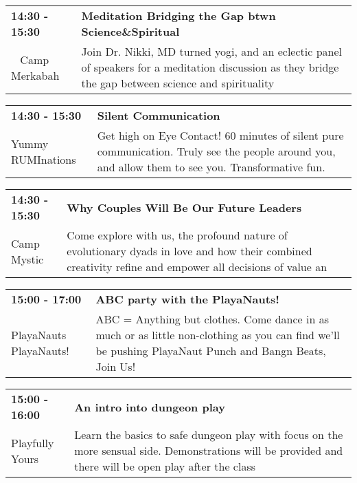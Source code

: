 \begin{tabular}{ p{1in} p{2.2in} }
    \textbf{14:30 - 15:30} & \textbf{Meditation Bridging the Gap btwn Science\&Spiritual} \\
    ~ \newline Camp Merkabah & Join Dr. Nikki, MD turned yogi, and an eclectic panel of speakers for a meditation discussion as they bridge the gap between science and spirituality \\
    \hline 
\end{tabular}
    
\begin{tabular}{ p{1in} p{2.2in} }
    \textbf{14:30 - 15:30} & \textbf{Silent Communication} \\
    Yummy RUMInations \newline  & Get high on Eye Contact!  60 minutes of silent pure communication.  Truly see the people around you, and allow them to see you.  Transformative fun. \\
    \hline 
\end{tabular}
    
\begin{tabular}{ p{1in} p{2.2in} }
    \textbf{14:30 - 15:30} & \textbf{Why Couples Will Be Our Future Leaders} \\
    Camp Mystic \newline  & Come explore with us, the profound nature of evolutionary dyads in love and how their combined creativity refine and empower all decisions of value an \\
    \hline 
\end{tabular}
    
\begin{tabular}{ p{1in} p{2.2in} }
    \textbf{15:00 - 17:00} & \textbf{ABC party with the PlayaNauts!} \\
    PlayaNauts \newline PlayaNauts! & ABC = Anything but clothes. Come dance in as much or as little non-clothing as you can find we'll be pushing PlayaNaut Punch and Bangn Beats, Join Us! \\
    \hline 
\end{tabular}
    
\begin{tabular}{ p{1in} p{2.2in} }
    \textbf{15:00 - 16:00} & \textbf{An intro into dungeon play} \\
    Playfully Yours \newline  & Learn the basics to safe dungeon play with focus on the more sensual side. Demonstrations will be provided and there will be open play after the class \\
    \hline 
\end{tabular}
    
